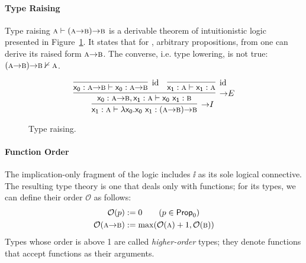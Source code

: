 \paragraph{Type Raising}
Type raising $\smallprop{A} \vdash (\smallprop{A} \ii \smallprop{B}) \ii \smallprop{B}$ is a derivable theorem of intuitionistic logic presented in Figure~\ref{figure:type_raising}. 
It states that for ,  arbitrary propositions, from  one can derive its raised form $\smallprop{A} \ii \smallprop{B}$.
The converse, i.e. type lowering, is not true: $(\smallprop{A} \ii \smallprop{B}) \ii \smallprop{B} \nvdash \smallprop{A}$.
\begin{figure}
	\[
		\infer[\ii I]{\term{x_1}: \prop{A} \vdash \term{\lambda x_0.x_0~x_1}: (\prop{A} \ii \prop{B}) \ii \prop{B}}{
			\infer[\ii E]{\term{x_0}: \prop{A} \ii \prop{B}, \term{x_1}: \prop{A} \vdash \term{x_0~x_1}: \prop{B}}{
				\infer[\Ax]{\term{x_0}: \prop{A} \ii \prop{B} \vdash \term{x_0}: \prop{A} \ii \prop{B}}{}
				&
				\infer[\Ax]{\term{x_1}: \prop{A} \vdash \term{x_1}: \prop{A}}{}
			}
		}
	\]
	\caption{Type raising.}
	\label{figure:type_raising}
\end{figure}

\paragraph{Function Order} The implication-only fragment of the logic includes $\ii$ as its sole logical connective.
The resulting type theory is one that deals only with functions; for its types, we can define their order $\mathcal{O}$ as follows:
\begin{align*}
\mathcal{O}(p) & := 0 \tag{$p \in \propcon{}$} \\
\mathcal{O}(\prop{A} \ii \prop{B}) & := \mathrm{max}(\mathcal{O}(\prop{A}) + 1, \mathcal{O}(\prop{B}))\\
\end{align*}
Types whose order is above 1 are called \textit{higher-order} types; they denote functions that accept functions as their arguments.

